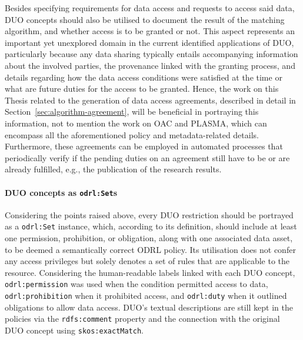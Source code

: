 Besides specifying requirements for data access and requests to access said data, DUO concepts should also be utilised to document the result of the matching algorithm, and whether access is to be granted or not.
This aspect represents an important yet unexplored domain in the current identified applications of DUO, particularly because any data sharing typically entails accompanying information about the involved parties, the provenance linked with the granting process, and details regarding how the data access conditions were satisfied at the time or what are future duties for the access to be granted.
Hence, the work on this Thesis related to the generation of data access agreements, described in detail in Section~\ref{sec:algorithm-agreement}, will be beneficial in portraying this information, not to mention the work on OAC and PLASMA, which can encompass all the aforementioned policy and metadata-related details.
Furthermore, these agreements can be employed in automated processes that periodically verify if the pending duties on an agreement still have to be or are already fulfilled, e.g., the publication of the research results.

\paragraph{DUO concepts as \texttt{odrl:Set}s}
Considering the points raised above, every DUO restriction should be portrayed as a \texttt{odrl:Set} instance, which, according to its definition, should include at least one permission, prohibition, or obligation, along with one associated data asset, to be deemed a semantically correct ODRL policy.
Its utilisation does not confer any access privileges but solely denotes a set of rules that are applicable to the resource.
Considering the human-readable labels linked with each DUO concept, \texttt{odrl:permission} was used when the condition permitted access to data, \texttt{odrl:prohibition} when it prohibited access, and \texttt{odrl:duty} when it outlined obligations to allow data access. 
DUO's textual descriptions are still kept in the policies via the \texttt{rdfs:comment} property and the connection with the original DUO concept using \texttt{skos:exactMatch}.


